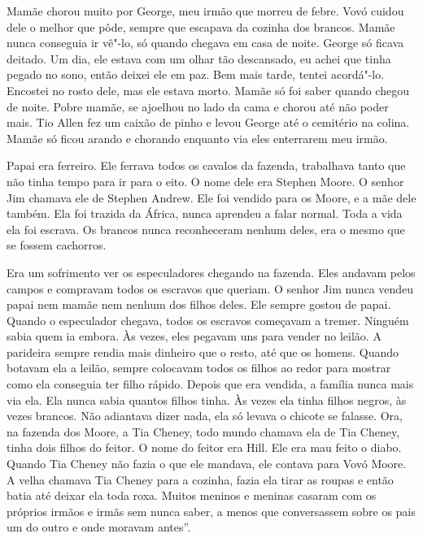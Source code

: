 Mamãe chorou muito por George, meu irmão que morreu de febre. Vovó
cuidou dele o melhor que pôde, sempre que escapava da cozinha dos
brancos. Mamãe nunca conseguia ir vê"-lo, só quando chegava em casa de
noite. George só ficava deitado. Um dia, ele estava com um olhar tão
descansado, eu achei que tinha pegado no sono, então deixei ele em paz.
Bem mais tarde, tentei acordá"-lo. Encostei no rosto dele, mas ele estava
morto. Mamãe só foi saber quando chegou de noite. Pobre mamãe, se
ajoelhou no lado da cama e chorou até não poder mais. Tio Allen fez um
caixão de pinho e levou George até o cemitério na colina. Mamãe só ficou
arando e chorando enquanto via eles enterrarem meu irmão.

Papai era ferreiro. Ele ferrava todos os cavalos da fazenda, trabalhava
tanto que não tinha tempo para ir para o eito. O nome dele era Stephen
Moore. O senhor Jim chamava ele de Stephen Andrew. Ele foi vendido para
os Moore, e a mãe dele também. Ela foi trazida da África, nunca aprendeu
a falar normal. Toda a vida ela foi escrava. Os brancos nunca
reconheceram nenhum deles, era o mesmo que se fossem cachorros.

Era um sofrimento ver os especuladores chegando na fazenda. Eles andavam
pelos campos e compravam todos os escravos que queriam. O senhor Jim
nunca vendeu papai nem mamãe nem nenhum dos filhos deles. Ele sempre
gostou de papai. Quando o especulador chegava, todos os escravos
começavam a tremer. Ninguém sabia quem ia embora. Às vezes, eles pegavam
uns para vender no leilão. A parideira sempre rendia mais dinheiro que o
resto, até que os homens. Quando botavam ela a leilão, sempre colocavam
todos os filhos ao redor para mostrar como ela conseguia ter filho
rápido. Depois que era vendida, a família nunca mais via ela. Ela nunca
sabia quantos filhos tinha. Às vezes ela tinha filhos negros, às vezes
brancos. Não adiantava dizer nada, ela só levava o chicote se falasse.
Ora, na fazenda dos Moore, a Tia Cheney, todo mundo chamava ela de Tia
Cheney, tinha dois filhos do feitor. O nome do feitor era Hill. Ele era
mau feito o diabo. Quando Tia Cheney não fazia o que ele mandava, ele
contava para Vovó Moore. A velha chamava Tia Cheney para a cozinha,
fazia ela tirar as roupas e então batia até deixar ela toda roxa. Muitos
meninos e meninas casaram com os próprios irmãos e irmãs sem nunca
saber, a menos que conversassem sobre os pais um do outro e onde moravam
antes''.

